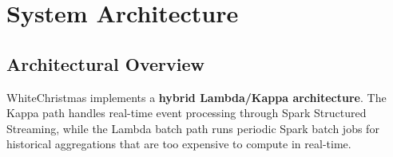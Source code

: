 \documentclass[12pt,a4paper]{article}
\begin{document}
\section{System Architecture}

\subsection{Architectural Overview}

WhiteChristmas implements a \textbf{hybrid Lambda/Kappa architecture}. The Kappa path handles real-time event processing through Spark Structured Streaming, while the Lambda batch path runs periodic Spark batch jobs for historical aggregations that are too expensive to compute in real-time.
\end{document}
